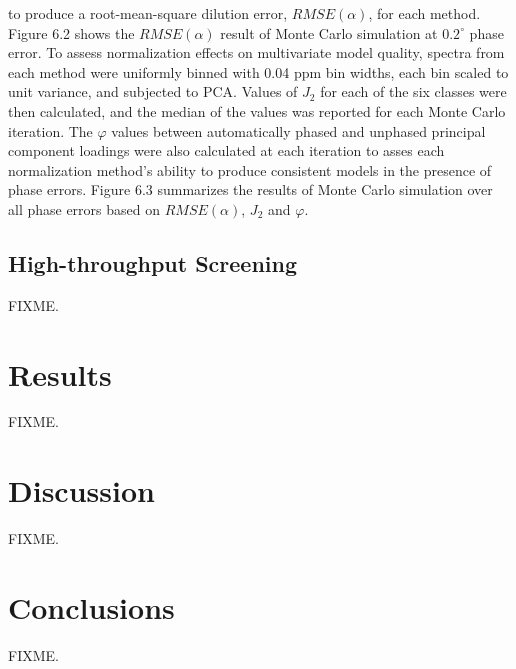 \begin{doublespace}
to produce a root-mean-square dilution error, $RMSE(\alpha)$, for each method.
Figure 6.2 shows the $RMSE(\alpha)$ result of Monte Carlo simulation at
$0.2^\circ$ phase error. To assess normalization effects on multivariate model
quality, spectra from each method were uniformly binned with 0.04 ppm bin
widths, each bin scaled to unit variance, and subjected to PCA. Values of
$J_2$ for each of the six classes were then calculated, and the median of the
values was reported for each Monte Carlo iteration. The $\varphi$ values
between automatically phased and unphased principal component loadings were
also calculated at each iteration to asses each normalization method's ability
to produce consistent models in the presence of phase errors. Figure 6.3
summarizes the results of Monte Carlo simulation over all phase errors based
on $RMSE(\alpha)$, $J_2$ and $\varphi$.
\end{doublespace}

\subsection{High-throughput Screening}

\begin{doublespace}
FIXME.
\end{doublespace}

\section{Results}

\begin{doublespace}
FIXME.
\end{doublespace}

\section{Discussion}

\begin{doublespace}
FIXME.
\end{doublespace}

\section{Conclusions}

\begin{doublespace}
FIXME.
\end{doublespace}





